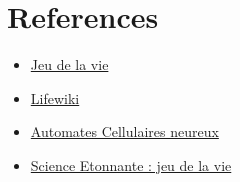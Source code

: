 \documentclass{article}
\begin{document}
    \noindent

    \noindent

    
    \tableofcontents
    \listoffigures
    \listoftables

    \newpage
    
    
    
    
    
    
    
    
    

     
    
    \section*{References}
    \begin{itemize}
   \item\href{http://pdbzro.com/gags/math/jeudelavie.pdf}{Jeu de la vie}
    \item\href{https://conwaylife.com/wiki/Main_Page}{Lifewiki}
    \item\href{https://neuralpatterns.io/}{Automates Cellulaires neureux}
    \item\href{https://www.youtube.com/watch?v=S-W0NX97DB0}{Science Etonnante : jeu de la vie}
    \end{itemize}
    
    
\end{document}

